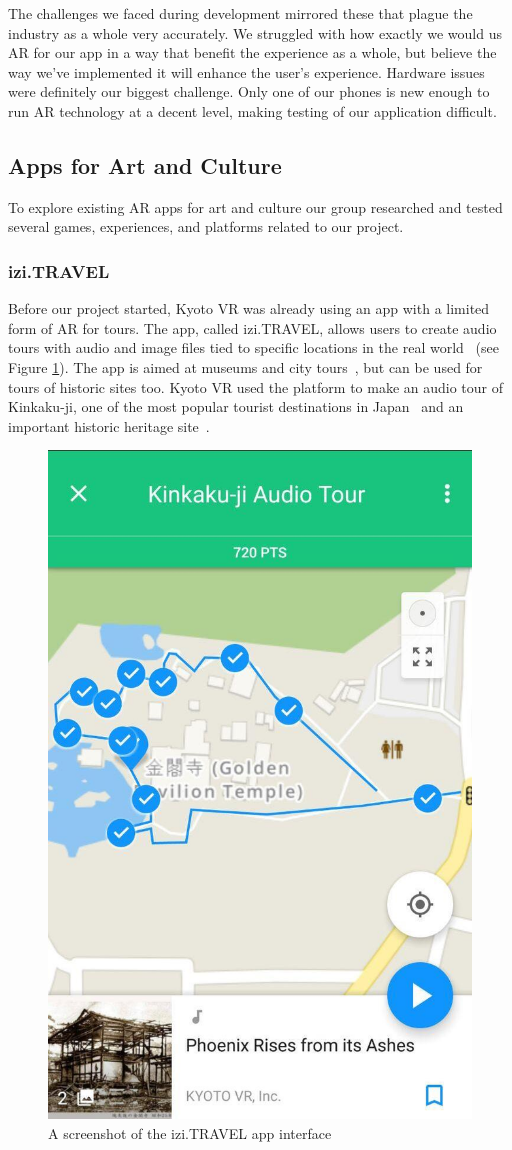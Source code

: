 \documentclass[a4paper, 10pt, american, titlepage]{article}
\begin{document}
The challenges we faced during development mirrored these that plague the industry
as a whole very accurately. We struggled with how exactly we would us AR for our app
in a way that benefit the experience as a whole, but believe the way we've implemented
it will enhance the user's experience. Hardware issues were definitely our biggest challenge.
Only one of our phones is new enough to run AR technology at a decent level, making
testing of our application difficult.  

\subsection{Apps for Art and Culture}
\label{sec:appsForArtAndCulture}

To explore existing AR apps for art and culture our group researched and tested
several games, experiences, and platforms related to our project.

\subsubsection{izi.TRAVEL}
\label{sec:iziTravel}

Before our project started, Kyoto VR was already using an app with a limited
form of AR for tours. The app, called izi.TRAVEL, allows users to create audio
tours with audio and image files tied to specific locations in the real
world~\autocite{izitravel2015} (see Figure \ref{fig:iziTravel}). The app is
aimed at museums and city tours~\autocite{izitravel}, but can be used for tours
of historic sites too.  Kyoto VR used the platform to make an audio tour of
Kinkaku-ji, one of the most popular tourist destinations in
Japan~\autocite{bornoff2000} and an important historic heritage
site~\autocite{unesco}.


\begin{figure}[h]
	\centering
	\includegraphics[width=.5\textwidth]{izi-travel.jpg}
	\caption{A screenshot of the izi.TRAVEL app interface}
	\label{fig:iziTravel}
\end{figure}
\end{document}
